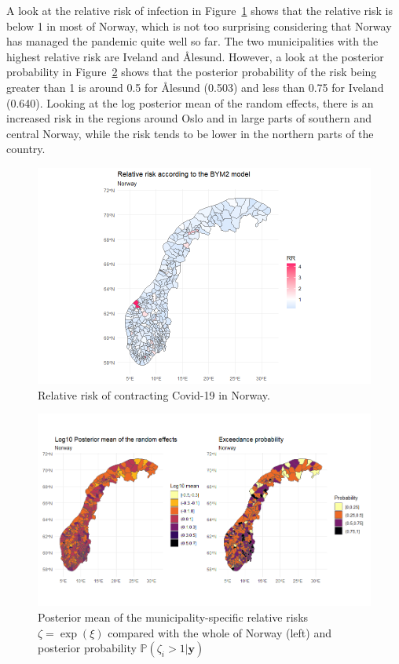 A look at the relative risk of infection in Figure~\ref{rr_norway} shows that the relative risk is below 1 in most of Norway, which is not too surprising considering that Norway has managed the pandemic quite well so far. The two municipalities with the highest relative risk are Iveland and Ålesund. However, a look at the posterior probability in Figure~\ref{posterior_norway} shows that the posterior probability of the risk being greater than 1 is around 0.5 for Ålesund (0.503) and less than 0.75 for Iveland (0.640). Looking at the log posterior mean of the random effects, there is an increased risk in the regions around Oslo and in large parts of southern and central Norway, while the risk tends to be lower in the northern parts of the country.
\begin{figure}[H]
  \centering
  \includegraphics[width = \textwidth]{relative_risk_norway.png}
  \caption{Relative risk of contracting Covid-19 in Norway.}
  \label{rr_norway}
\end{figure}
\begin{figure}[H]
  \centering
  \includegraphics[width = \textwidth]{posterior_norway.png}
  \caption{Posterior mean of the municipality-specific relative risks $\zeta=\exp{\left(\xi\right)}$ compared with the whole of Norway (left) and posterior probability $\mathbb{P}\left(\zeta_i>1|\pmb{y}\right)$}
  \label{posterior_norway}
\end{figure}
